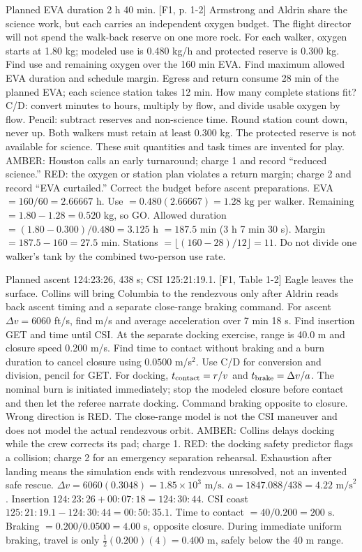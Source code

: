 {Planned EVA duration 2 h 40 min. [F1, p. 1-2]}
{Armstrong and Aldrin share the science work, but each carries an
independent oxygen budget. The flight director will not spend the
walk-back reserve on one more rock.}
{For each walker, oxygen starts at 1.80 kg; modeled use is
0.480 kg/h and protected reserve is 0.300 kg.
Find use and remaining oxygen over the 160 min EVA.
Find maximum allowed EVA duration and schedule margin.
Egress and return consume 28 min of the planned EVA; each science
station takes 12 min. How many complete stations fit?}
{C/D: convert minutes to hours, multiply by flow,
and divide usable oxygen by flow.
Pencil: subtract reserves and non-science time.
Round station count down, never up.}
{Both walkers must retain at least 0.300 kg.
The protected reserve is not available for science. These suit quantities
and task times are invented for play.}
{AMBER: Houston calls an early turnaround; charge 1 and record
``reduced science.'' RED: the oxygen or station plan violates a return
margin; charge 2 and record ``EVA curtailed.'' Correct the budget
before ascent preparations.}
{EVA \(=160/60=2.66667\) h.
Use \(=0.480(2.66667)=\boxed{1.28\text{ kg per walker}}\).
Remaining \(=1.80-1.28=\boxed{0.520\text{ kg}}\), so GO.
Allowed duration \(=(1.80-0.300)/0.480=3.125\) h
\(=\boxed{187.5\text{ min}}\) (3 h 7 min 30 s).
Margin \(=187.5-160=\boxed{27.5\text{ min}}\).
Stations \(=\lfloor(160-28)/12\rfloor=\boxed{11}\).
Do not divide one walker's tank by the combined two-person use rate.}

{Planned ascent 124:23:26, 438 s; CSI 125:21:19.1. [F1, Table 1-2]}
{Eagle leaves the surface. Collins will bring Columbia to the rendezvous
only after Aldrin reads back ascent timing and a separate close-range
braking command.}
{For ascent \(\Delta v=6060\) ft/s, find m/s and average acceleration
over 7 min 18 s. Find insertion GET and time until CSI.
At the separate docking exercise, range is 40.0 m and closure speed
0.200 m/s. Find time to contact without braking and a burn duration
to cancel closure using \(0.0500\) m/s\(^{2}\).}
{Use C/D for conversion and division, pencil for GET.
For docking, \(t_{\rm contact}=r/v\) and \(t_{\rm brake}=\Delta v/a\).
The nominal burn is initiated immediately; stop the modeled closure
before contact and then let the referee narrate docking.}
{Command braking opposite to closure. Wrong direction is RED.
The close-range model is not the CSI maneuver and does not model
the actual rendezvous orbit.}
{AMBER: Collins delays docking while the crew corrects its pad; charge 1.
RED: the docking safety predictor flags a collision; charge 2 for an
emergency separation rehearsal. Exhaustion after landing means the
simulation ends with rendezvous unresolved, not an invented safe rescue.}
{\(\Delta v=6060(0.3048)=\boxed{1.85\times10^3\text{ m/s}}\).
\(\bar a=1847.088/438=\boxed{4.22\text{ m/s}^2}\).
Insertion \(124{:}23{:}26+00{:}07{:}18
=\boxed{124{:}30{:}44}\).
CSI coast \(125{:}21{:}19.1-124{:}30{:}44
=\boxed{00{:}50{:}35.1}\).
Time to contact \(=40/0.200=\boxed{200\text{ s}}\).
Braking \(=0.200/0.0500=\boxed{4.00\text{ s}}\), opposite closure.
During immediate uniform braking, travel is only
\(\tfrac12(0.200)(4)=0.400\) m, safely below the 40 m range.}

